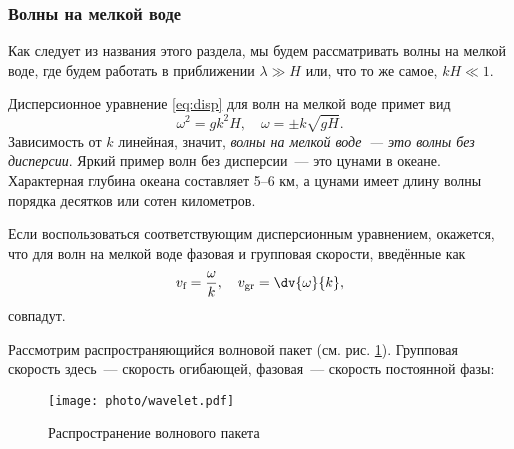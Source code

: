 \subsubsection{Волны на мелкой воде}
Как следует из названия этого раздела, мы будем рассматривать волны на мелкой воде, где будем работать в приближении $\lambda \gg H$ или, что то же самое,  $kH\ll 1$.

Дисперсионное уравнение \eqref{eq:disp} для волн на мелкой воде примет вид
\begin{equation}
	\omega^2=gk^2H, \quad \omega=\pm k\sqrt{gH}.
\end{equation}
Зависимость от $k$ линейная, значит, \textit{волны на мелкой воде~--- это волны без дисперсии}. Яркий пример волн без дисперсии~--- это цунами в океане. Характерная глубина океана составляет 5--6 км, а цунами имеет длину волны порядка десятков или сотен километров.



Если воспользоваться соответствующим дисперсионным уравнением, окажется, что для волн на мелкой воде фазовая и групповая скорости, введённые как
\begin{equation}
	v_\text{f}=\frac{\omega}{k}, \quad
	v_\text{gr}=\dv{\omega}{k},
\end{equation}
совпадут.



Рассмотрим распространяющийся волновой пакет (см. рис. \ref{fig:wavelet}). Групповая скорость здесь~--- скорость огибающей, фазовая~--- скорость постоянной фазы:
\begin{figure}[H]
    \centering
    \texttt{[image: photo/wavelet.pdf]}
    \caption{Распространение волнового пакета}
    \label{fig:wavelet}
\end{figure}






